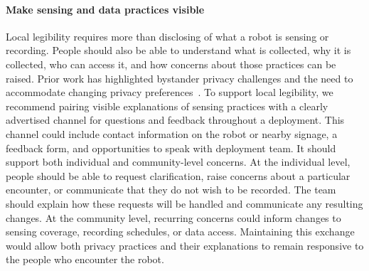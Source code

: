 \paragraph{Make sensing and data practices visible} 
Local legibility requires more than disclosing of what a robot is sensing or recording. People should also be able to understand what is collected, why it is collected, who can access it, and how concerns about those practices can be raised. Prior work has highlighted bystander privacy challenges and the need to accommodate changing privacy preferences~\cite{rueben2018themes, dietrich2026bystander}. To support local legibility, we recommend pairing visible explanations of sensing practices with a clearly advertised channel for questions and feedback throughout a deployment. This channel could include contact information on the robot or nearby signage, a feedback form, and opportunities to speak with deployment team. It should support both individual and community-level concerns.  At the individual level, people should be able to request clarification, raise concerns about a particular encounter, or communicate that they do not wish to be recorded. The team should explain how these requests will be handled and communicate any resulting changes. At the community level, recurring concerns could inform changes to sensing coverage, recording schedules, or data access. Maintaining this exchange would allow both privacy practices and their explanations to remain responsive to the people who encounter the robot.